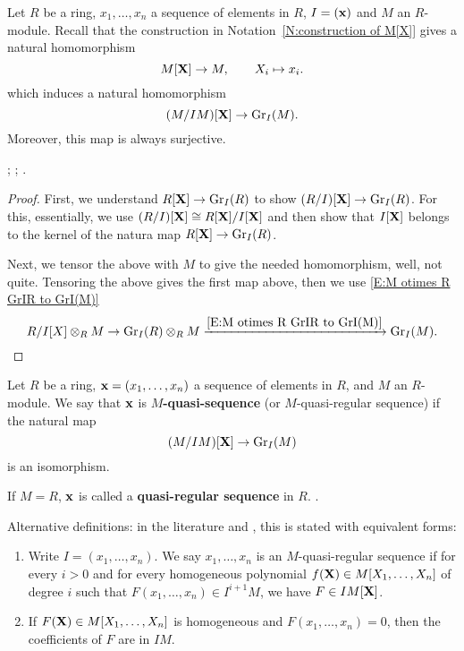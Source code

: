 	\begin{lemma}
		Let $R$ be a ring, $x_1, \dots, x_n$ a sequence of elements in $R$, $I = (\mathbf{x})$ and $M$ an $R$-module. Recall that the construction in Notation~\ref{N:construction of M[X]} gives a natural homomorphism
		$$
		M[\mathbf{X}] \to M, \qquad X_i \mapsto x_i.
		$$
		which induces a natural homomorphism
		$$
		(M/IM)[\mathbf{X}] \to \mathrm{Gr}_I(M).
		$$
		Moreover, this map is always surjective.
		
		\cite[end of page 17]{BH}; \cite[(15.B)]{matsumura-alg}; \cite[\href{https://stacks.math.columbia.edu/tag/061N}{Equation 061N}]{stacks-project}.
	\end{lemma}
	\begin{proof}
		First, we understand $R[\mathbf{X}] \to \mathrm{Gr}_I(R)$ to show $(R/I)[\mathbf{X}] \to \mathrm{Gr}_I(R)$. For this, essentially, we use $(R/I)[\mathbf{X}] \cong R[\mathbf{X}]/I[\mathbf{X}]$ and then show that $I[\mathbf{X}]$ belongs to the kernel of the natura map $R[\mathbf{X}] \to \mathrm{Gr}_I(R)$.
		
		
		
		
		Next, we tensor the above with $M$ to give the needed homomorphism, well, not quite. Tensoring the above gives the first map above, then we use \eqref{E:M otimes R GrIR to GrI(M)}
		$$
		R/I[X] \otimes_R M \to \mathrm{Gr}_I(R)\otimes_RM \xrightarrow{\eqref{E:M otimes R GrIR to GrI(M)}} \mathrm{Gr}_I(M).
		$$
	\end{proof}
	
	
	
	
	\begin{definition}
		Let $R$ be a ring, $\mathbf{x} = (x_1, \dots, x_n)$ a sequence of elements in $R$, and $M$ an $R$-module. We say that $\mathbf{x}$ is {\bf $M$-quasi-sequence}  (or $M$-quasi-regular sequence) if the natural map
		$$
		(M/IM)[\mathbf{X}] \to \mathrm{Gr}_I(M)
		$$
		is an isomorphism.
		
		
		If $M=R$, $\mathbf{x}$ is called a {\bf quasi-regular sequence} in $R$.
		\cite[\href{https://stacks.math.columbia.edu/tag/061P}{Definition 061P}]{stacks-project}.
	\end{definition}
	
	\begin{remark}
		Alternative definitions: in the literature \cite{matsumura-ring} and \cite[(15.B)]{matsumura-alg}, this is stated with equivalent forms:
		\begin{enumerate}
			\item Write $I= (x_1, \dots,x_n)$. We say $x_1, \dots, x_n$ is an $M$-quasi-regular sequence if  for every $i >0$ and for every homogeneous polynomial $f(\mathbf{X}) \in M[X_1, \dots, X_n]$ of degree $i$ such that $F(x_1,\dots, x_n) \in I^{i+1}M$, we have $F \in IM[\mathbf{X}]$.
			\item If $F(\mathbf{X}) \in M[X_1, \dots, X_n]$ is homogeneous and $F(x_1, \dots, x_n) =0$, then the coefficients of $F$ are in $IM$.
		\end{enumerate}
	\end{remark}
	
